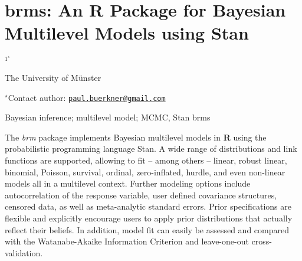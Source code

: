 \documentclass[\main/boa.tex]{subfiles}
\begin{document}
\section{brms: An R Package for Bayesian Multilevel Models using Stan}

\begin{center}
  {\bf {}$^{1^\star}$}
\end{center}

\vskip 0.3cm

\begin{affiliations}
\begin{enumerate}
\begin{minipage}{0.915\textwidth}
\centering
\item The University of Münster \\[-2pt]
\end{minipage}
\end{enumerate}
$^\star$Contact author: \href{mailto:paul.buerkner@gmail.com}{\nolinkurl{paul.buerkner@gmail.com}}\\
\end{affiliations}

\vskip 0.5cm

\begin{minipage}{0.915\textwidth}
\keywords Bayesian inference; multilevel model; MCMC, Stan
\packages brms
\end{minipage}

\vskip 0.8cm

The \emph{brm} package implements Bayesian multilevel models in
\textbf{R} using the probabilistic programming language Stan. A wide
range of distributions and link functions are supported, allowing to fit
-- among others -- linear, robust linear, binomial, Poisson, survival,
ordinal, zero-inflated, hurdle, and even non-linear models all in a
multilevel context. Further modeling options include autocorrelation of
the response variable, user defined covariance structures, censored
data, as well as meta-analytic standard errors. Prior specifications are
flexible and explicitly encourage users to apply prior distributions
that actually reflect their beliefs. In addition, model fit can easily
be assessed and compared with the Watanabe-Akaike Information Criterion
and leave-one-out cross-validation.
\end{document}
